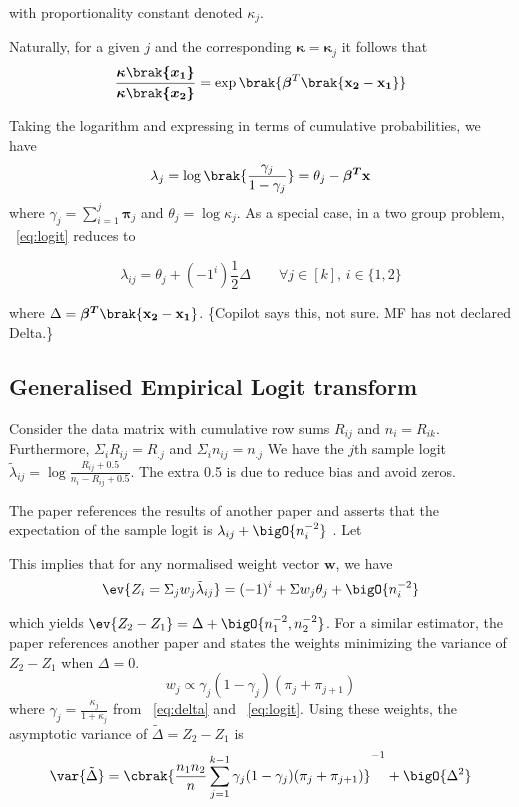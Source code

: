 \documentclass{amsart}
\begin{document}
        with proportionality constant denoted \(\kappa_j\).

        Naturally, for a given \(j\) and the corresponding \(\boldsymbol{\kappa} = \boldsymbol{\kappa}_j\) it follows that 
        \[
            \boldsymbol{\frac{\kappa\brak{x_1}}{\kappa\brak{x_2}}} = \exp \brak{\boldsymbol{\beta}^T \brak{\mathbf{x_2 - x_1}}}
        \]

        Taking the logarithm and expressing in terms of cumulative probabilities, we have
        \[
            \lambda_j = \log\brak{\frac{\gamma_j}{1 - \gamma_j}} = \theta_j - \boldsymbol{\beta^T} \mathbf{x} \label{eq:logit}
        \] where \( \displaystyle \gamma_j = \sum_{i = 1}^{j} \mathbf{\pi}_j\) and \(\theta_j = \log \kappa_j\). 
        As a special case, in a two group problem, ~\ref{eq:logit} reduces to 
        
        \[\lambda_{ij} = \theta_j + (-1^i) \frac{1}{2} \Delta \qquad \forall j \in [k],\, i \in \{1, 2\} \label{eq:delta}\]
    
        where \(\Delta = \boldsymbol{\beta^T} \brak{\mathbf{x_2 - x_1}}\). \{Copilot says this, not sure. MF has not declared Delta.\}

        \subsection{Generalised Empirical Logit transform}

        Consider the data matrix with cumulative row sums \(R_{ij}\) and \(n_i = R_{ik}\). Furthermore, \( \Sigma_i R_{ij} = R_{.j}\) and \(\Sigma_i n_{ij} = n_{.j}\) We have the \(j\)th sample logit \(\tilde{\lambda}_{ij} = \log \frac{R_{ij} + 0.5}{n_i - R_{ij} + 0.5}\). The extra 0.5 is due to reduce bias and avoid zeros. 
        
        The paper references the results of another paper and asserts that the expectation of the sample logit is \(\lambda_{ij} + \bigO{n_i^{-2}}\) . Let

        This implies that for any normalised weight vector \(\mathbf{w}\), we have \[\ev{Z_i = \Sigma_j w_j \tilde{\lambda}_{ij}} = (-1)^i + \Sigma w_j \theta_j + \bigO{n_i^{-2}}\]

        which yields \(\ev{Z_2 - Z_1} = \Delta + \bigO{n_1^{-2}, n_2^{-2}}\). For a similar estimator, the paper references another paper and states the weights minimizing the variance of \(Z_2 - Z_1\) when \(\Delta = 0\). 
        \[w_j \propto \gamma_j(1 - \gamma_j)(\pi_j + \pi_{j + 1})\] 
        where \(\gamma_j = \frac{\kappa_j}{1 + \kappa_j}\) from ~\ref{eq:delta} and ~\ref{eq:logit}. Using these weights, the asymptotic variance of \(\tilde{\Delta} = Z_2 - Z_1\) is \[\var{\tilde{\Delta}} = \cbrak{\frac{n_1 n_2}{n}\sum_{j = 1}^{k - 1} \gamma_j(1 - \gamma_j)(\pi_j + \pi_{j + 1})}^{-1} + \bigO{\Delta^2} \]
\end{document}
